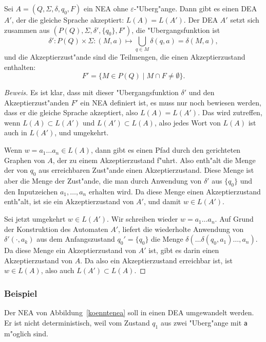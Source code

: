 \begin{satz}
\label{satz_neadea_eps}
Sei $A=(Q,\Sigma,\delta,q_0,F)$ ein NEA ohne $\varepsilon$-"Uberg"ange.
Dann gibt es einen DEA $A'$, der die gleiche Sprache akzeptiert: $L(A)=L(A')$.
Der DEA $A'$ setzt sich zusammen aus
$(P(Q), \Sigma, \delta', \{q_0\}, F')$,
die "Ubergangsfunktion ist
\[
\delta'\colon P(Q)\times \Sigma: (M, a)\mapsto \bigcup_{q\in M} \delta(q,a)
=\delta(M,a),
\]
und die Akzeptierzust"ande sind die Teilmengen, die einen Akzeptierzustand
enthalten:
\[
F'=\{M\in P(Q)\;|\;M\cap F\ne \emptyset\}.
\]
\end{satz}
\begin{proof}[Beweis]
Es ist klar, dass mit dieser "Ubergangsfunktion $\delta'$ und den
Akzeptierzust"anden $F'$ ein NEA definiert ist, es muss nur noch
bewiesen werden, dass er die gleiche Sprache akzeptiert, also
$L(A)=L(A')$. Das wird zutreffen, wenn $L(A)\subset L(A')$ und
$L(A')\subset L(A)$, also jedes Wort von $L(A)$ ist auch in $L(A')$,
und umgekehrt.

Wenn $w=a_1\dots a_n\in L(A)$, dann gibt es einen Pfad durch den gerichteten
Graphen von $A$, der zu einem Akzeptierzustand f"uhrt. Also enth"alt
die Menge der von $q_0$ aus erreichbaren Zust"ande einen Akzeptierzustand.
Diese Menge ist aber die Menge der Zust"ande, die man durch Anwendung
von $\delta'$ aus $\{q_0\}$ und den Inputzeichen $a_1,\dots,a_n$ erhalten
wird. Da diese Menge einen Akzeptierzustand enth"alt, ist sie ein
Akzeptierzustand von $A'$, und damit $w\in L(A')$.

Sei jetzt umgekehrt $w\in L(A')$. Wir schreiben wieder $w=a_1\dots a_n$.
Auf Grund der Konstruktion des Automaten $A'$, liefert die wiederholte
Anwendung von $\delta'(\cdot, a_k)$ aus dem Anfangszustand $q_0'=\{q_0\}$
die Menge $\delta(\dots\delta(q_0, a_1)\dots ,a_n)$. Da diese Menge ein
Akzeptierzustand von $A'$ ist, gibt es darin einen Akzeptierzustand
von $A$. Da also ein Akzeptierzustand erreichbar ist, ist $w\in L(A)$,
also auch $L(A')\subset L(A)$.
\end{proof}

\subsubsection{Beispiel}
Der NEA von Abbildung~\ref{koenntenea}
soll in einen DEA umgewandelt werden. Er ist nicht deterministisch,
weil vom Zustand $q_1$ aus zwei "Uberg"ange mit {\tt a} m"oglich sind.


